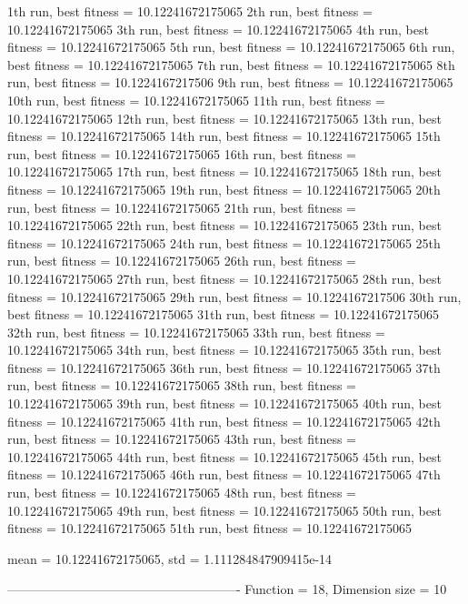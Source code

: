 1th run, best fitness = 10.12241672175065
2th run, best fitness = 10.12241672175065
3th run, best fitness = 10.12241672175065
4th run, best fitness = 10.12241672175065
5th run, best fitness = 10.12241672175065
6th run, best fitness = 10.12241672175065
7th run, best fitness = 10.12241672175065
8th run, best fitness = 10.1224167217506
9th run, best fitness = 10.12241672175065
10th run, best fitness = 10.12241672175065
11th run, best fitness = 10.12241672175065
12th run, best fitness = 10.12241672175065
13th run, best fitness = 10.12241672175065
14th run, best fitness = 10.12241672175065
15th run, best fitness = 10.12241672175065
16th run, best fitness = 10.12241672175065
17th run, best fitness = 10.12241672175065
18th run, best fitness = 10.12241672175065
19th run, best fitness = 10.12241672175065
20th run, best fitness = 10.12241672175065
21th run, best fitness = 10.12241672175065
22th run, best fitness = 10.12241672175065
23th run, best fitness = 10.12241672175065
24th run, best fitness = 10.12241672175065
25th run, best fitness = 10.12241672175065
26th run, best fitness = 10.12241672175065
27th run, best fitness = 10.12241672175065
28th run, best fitness = 10.12241672175065
29th run, best fitness = 10.1224167217506
30th run, best fitness = 10.12241672175065
31th run, best fitness = 10.12241672175065
32th run, best fitness = 10.12241672175065
33th run, best fitness = 10.12241672175065
34th run, best fitness = 10.12241672175065
35th run, best fitness = 10.12241672175065
36th run, best fitness = 10.12241672175065
37th run, best fitness = 10.12241672175065
38th run, best fitness = 10.12241672175065
39th run, best fitness = 10.12241672175065
40th run, best fitness = 10.12241672175065
41th run, best fitness = 10.12241672175065
42th run, best fitness = 10.12241672175065
43th run, best fitness = 10.12241672175065
44th run, best fitness = 10.12241672175065
45th run, best fitness = 10.12241672175065
46th run, best fitness = 10.12241672175065
47th run, best fitness = 10.12241672175065
48th run, best fitness = 10.12241672175065
49th run, best fitness = 10.12241672175065
50th run, best fitness = 10.12241672175065
51th run, best fitness = 10.12241672175065

mean = 10.12241672175065, std = 1.111284847909415e-14

-------------------------------------------------------
Function = 18, Dimension size = 10

